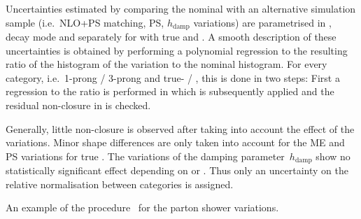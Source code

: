 Uncertainties estimated by comparing the nominal with an alternative
simulation sample (i.e.\ NLO+PS matching, PS, $h_\text{damp}$
variations) are parametrised in \tauhadvis \pT, \tauhadvis decay mode
and \mTW separately for \ttbar with true and \faketauhadvis.  A smooth
description of these uncertainties is obtained by performing a
polynomial regression to the resulting ratio of the histogram of the
variation to the nominal histogram. For every category, i.e.\ 1-prong
/ 3-prong \tauhadvis and true- / \faketauhadvis, this is done in two
steps: First a regression to the ratio is performed in \tauhadvis \pT
which is subsequently applied and the residual non-closure in \mTW is
checked.

Generally, little non-closure is observed after taking into account
the \tauhadvis \pT effect of the variations. Minor shape differences
are only taken into account for the ME and PS variations for true
\tauhadvis. The variations of the damping parameter~$h_\text{damp}$
show no statistically significant effect depending on \tauhadvis or
\mTW. Thus only an uncertainty on the relative normalisation between
categories is assigned.

An example of the procedure~ for the
parton shower variations.


